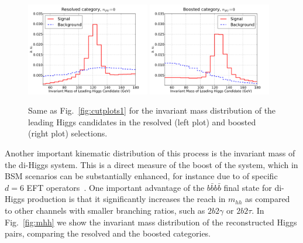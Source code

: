 \begin{figure}[t]
\begin{center}
  \includegraphics[width=0.48\textwidth]{plots/m_H0_res_C1d_noPU.pdf}
  \includegraphics[width=0.48\textwidth]{plots/m_H0_bst_C1d_noPU.pdf}
  \caption{\small Same as   Fig.~\ref{fig:cutplots1} for the invariant
    mass distribution of the leading Higgs candidates in the resolved
    (left plot) and boosted (right plot) selections.
}
\label{fig:mHHinv}
\end{center}
\end{figure}


Another important kinematic distribution of this process is the invariant mass
of the di-Higgs system.
%
This is a direct measure of the boost of the system,
which in  BSM scenarios can be substantially
enhanced, for instance due to
of specific $d=6$ EFT operators~\cite{Azatov:2015oxa}.
%
One important advantage of the $b\bar{b}b\bar{b}$ final state for
di-Higgs production is that it significantly increases the reach
in $m_{hh}$ as compared to other channels with smaller branching
ratios,
such as $2b2\gamma$ or $2b2\tau$.
%
In Fig.~\ref{fig:mhh} we show the invariant mass distribution of the
reconstructed Higgs pairs,
comparing the resolved and the boosted categories.

